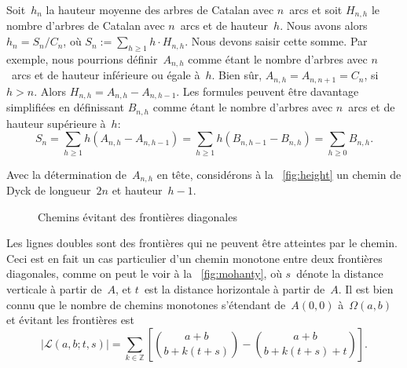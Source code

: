 Soit~\(h_n\) la hauteur moyenne des arbres de Catalan avec \(n\)~arcs
et soit \(H_{n,h}\) le nombre d'arbres de Catalan avec \(n\)~arcs et
de hauteur~\(h\). Nous avons alors \(h_n = S_n/C_{n}\), où \(S_n :=
\sum_{h \geqslant 1} h \cdot H_{n,h}\). Nous devons saisir cette
somme. Par exemple, nous pourrions définir~\(A_{n,h}\) comme étant le
nombre d'arbres avec \(n\)~arcs et de hauteur inférieure ou égale
à~\(h\). Bien sûr, \(A_{n,h} = A_{n,n+1} = C_{n}\), si \(h >
n\). Alors \(H_{n,h} = A_{n,h}-A_{n,h-1}\). Les formules peuvent être
davantage simplifiées en définissant \(B_{n,h}\) comme étant le nombre
d'arbres avec \(n\)~arcs et de hauteur supérieure à~\(h\):
\begin{equation}
S_n = \sum_{h \geqslant 1}h(A_{n,h}-A_{n,h-1})
    = \sum_{h \geqslant 1}h(B_{n,h-1}-B_{n,h}) = \sum_{h\geqslant 0} B_{n,h}.
\label{eq:Sn}
\end{equation}

Avec la détermination de~\(A_{n,h}\) en tête, considérons à la
\fig~\ref{fig:height} un chemin de Dyck de longueur~\(2n\) et
hauteur~\(h-1\).
\begin{figure}[!b]
\centering
{}
\quad
{}
\caption{Chemins évitant des frontières diagonales}
\label{fig:boundaries}
\end{figure}
Les lignes doubles sont des frontières qui ne peuvent être atteintes
par le chemin. Ceci est en fait un cas particulier d'un chemin
monotone entre deux frontières diagonales, comme on peut le voir à la
\fig~\ref{fig:mohanty}, où \(s\)~dénote la distance verticale à partir
de~\(A\), et \(t\)~est la distance horizontale à partir de~\(A\). Il
est bien connu que le nombre de chemins monotones s'étendant
de~\(A(0,0)\) à~\(\Omega(a,b)\) et évitant les frontières est
\begin{equation}
\left\lvert\mathcal{L}(a,b;t,s)\right\rvert = \sum_{k \in \mathbb{Z}}\left[\binom{a+b}{b+k(t+s)} - \binom{a+b}{b+k(t+s)+t}\right].
\label{eq:mohanty}
\end{equation}

